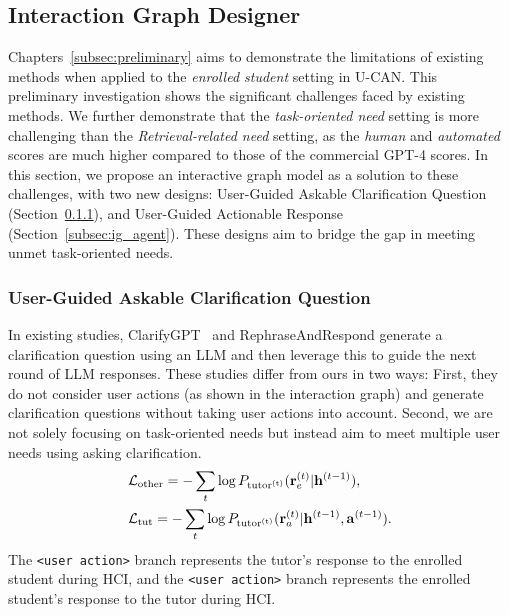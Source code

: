 \documentclass{article} %
\theoremstyle{definition}
\begin{document}
\subsection{Interaction Graph Designer}
\label{intergraph}

% 

Chapters~\ref{subsec:preliminary} aims to demonstrate the limitations of existing methods when applied to the \textit{enrolled student} setting in U-CAN.
This preliminary investigation shows the significant challenges faced by existing methods.
We further demonstrate that the \textit{task-oriented need} setting is more challenging than the \textit{Retrieval-related need} setting, as the \textit{human} and \textit{automated} scores are much higher compared to those of the commercial GPT-4 scores.
In this section, we propose an interactive graph model as a solution to these challenges, with two new designs: User-Guided Askable Clarification Question (Section~\ref{subsec:ig_user}), and User-Guided Actionable Response (Section~\ref{subsec:ig_agent}). These designs aim to bridge the gap in meeting unmet task-oriented needs.

\subsubsection{User-Guided Askable Clarification Question}
\label{subsec:ig_user}
In existing studies, ClarifyGPT~\citep{clarifygpt} and RephraseAndRespond generate a clarification question using an LLM and then leverage this to guide the next round of LLM responses.
These studies differ from ours in two ways: First, they do not consider user actions (as shown in the interaction graph) and generate clarification questions without taking user actions into account.
Second, we are not solely focusing on task-oriented needs but instead aim to meet multiple user needs using asking clarification.
\begin{equation}
\begin{aligned}
& \mathcal{L}_{\rm other} = - \sum_t \log P_{\rm tutor^{(t)}} (\mathbf{r}^{(t)}_e | \mathbf{h}^{(t-1)}), \\ 
& \mathcal{L}_{\rm tut} = - \sum_t \log P_{\rm tutor^{(t)}} (\mathbf{r}^{(t)}_a | \mathbf{h}^{(t-1)}, \mathbf{a}^{(t-1)}).
\end{aligned}
\end{equation}
The \colorbox{answercolor}{\texttt{<user action>}} branch represents the tutor's response to the enrolled student during HCI, and the \colorbox{answercolor}{\texttt{<user action>}} branch represents the enrolled student's response to the tutor during HCI.
\end{document}
